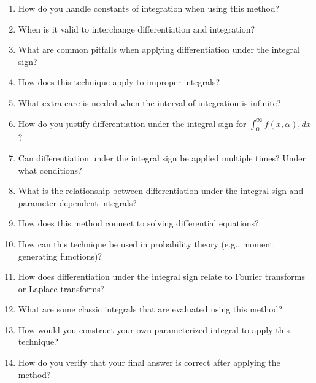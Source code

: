 \begin{enumerate}
  \item How do you handle constants of integration when using this method?
  \item When is it valid to interchange differentiation and integration?
  \item What are common pitfalls when applying differentiation under the integral sign?
  \item How does this technique apply to improper integrals?
  \item What extra care is needed when the interval of integration is infinite?
  \item How do you justify differentiation under the integral sign for \(\int_{0}^{\infty} f(x,\alpha),dx\)?
  \item Can differentiation under the integral sign be applied multiple times? Under what conditions?
  \item What is the relationship between differentiation under the integral sign and parameter-dependent integrals?
  \item How does this method connect to solving differential equations?
  \item How can this technique be used in probability theory (e.g., moment generating functions)?
  \item How does differentiation under the integral sign relate to Fourier transforms or Laplace transforms?
  \item What are some classic integrals that are evaluated using this method?
  \item How would you construct your own parameterized integral to apply this technique?
  \item How do you verify that your final answer is correct after applying the method?
\end{enumerate}
